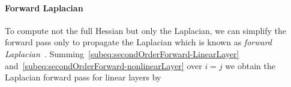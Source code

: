 \paragraph{Forward Laplacian}
To compute not the full Hessian but only the Laplacian, we can simplify the forward pass only to propagate the Laplacian which is known as \emph{forward Laplacian}~\citep{li2023forward}.
Summing~\eqref{subeq:secondOrderForward-LinearLayer} and~\eqref{subeq:secondOrderForward-nonlinearLayer} over $i=j$ we obtain the Laplacian forward pass for linear layers by
\begin{comment}
    \begin{align}
  \mZ^{(l)}\coloneqq %
  \begin{pmatrix}
    \vz^{(l)}
    \\
    \partial_{\vx_1} \vz^{(l)}
    \\
    \vdots
    \\
    \partial_{\vx_d} \vz^{(l)}
    \\
    \Delta_\vx\vz^{(l)}
  \end{pmatrix}
  & =
    \begin{pmatrix}
    \mW^{(l)}\vz^{(l-1)}
    \\
    \mW^{(l)}\partial_{\vx_1} \vz^{(l-1)}
    \\
    \vdots
    \\
    \mW^{(l)}\partial_{\vx_d} \vz^{(l-1)}
    \\
    \mW^{(l)}\Delta_\vx\vz^{(l-1)}
  \end{pmatrix}
    \label{eq:forward-laplacian-linear-layer-compact}
\end{align}
\end{comment}
